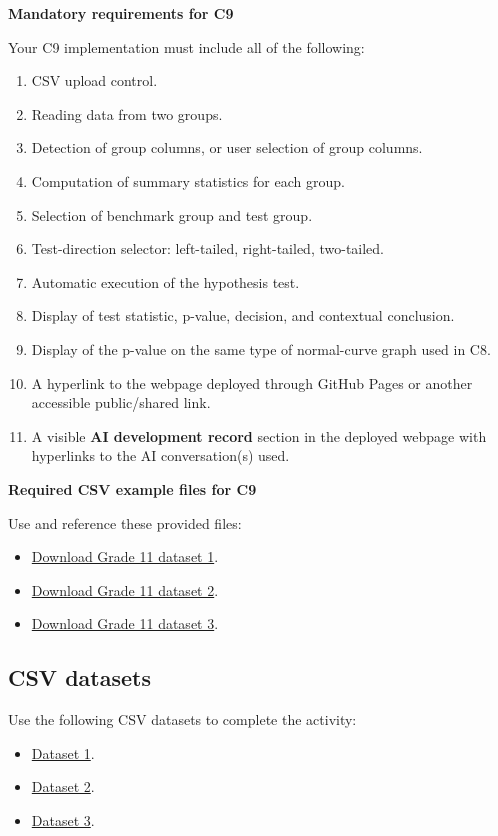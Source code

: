 \documentclass[12pt]{article}
\newcommand{\SubsectionBox}[1]{%
	\noindent\colorbox{gray!30}{%
		\parbox{\linewidth}{\textbf{#1}}%
	}\par\vspace{0.35cm}%
}
\begin{document}
	\SubsectionBox{Mandatory requirements for C9}
	Your C9 implementation must include all of the following:
	\begin{enumerate}
		\item CSV upload control.
		\item Reading data from two groups.
		\item Detection of group columns, or user selection of group columns.
		\item Computation of summary statistics for each group.
		\item Selection of benchmark group and test group.
		\item Test-direction selector: left-tailed, right-tailed, two-tailed.
		\item Automatic execution of the hypothesis test.
		\item Display of test statistic, p-value, decision, and contextual conclusion.
		\item Display of the p-value on the same type of normal-curve graph used in C8.
		\item A hyperlink to the webpage deployed through GitHub Pages or another accessible public/shared link.
		\item A visible \textbf{AI development record} section in the deployed webpage with hyperlinks to the AI conversation(s) used.
	\end{enumerate}
	
	\SubsectionBox{Required CSV example files for C9}
	Use and reference these provided files:
	\begin{itemize}
		\item \href{G11_T3_L4_C8C9C10_dataset_1.csv}{Download Grade 11 dataset 1}.
		\item \href{G11_T3_L4_C8C9C10_dataset_2.csv}{Download Grade 11 dataset 2}.
		\item \href{G11_T3_L4_C8C9C10_dataset_3.csv}{Download Grade 11 dataset 3}.
	\end{itemize}
	
	\subsection*{CSV datasets}

	Use the following CSV datasets to complete the activity:
	\begin{itemize}
		\item \href{https://correosanbartoloedu-my.sharepoint.com/:x:/g/personal/nicolas_lopez_sanbartolo_edu_co/IQCYNF1OE20rQLJqdJg3pzpfAQv1u6tDoW0kHBnX_LXwtYA?e=n76GM0}{Dataset 1}.
		\item \href{https://correosanbartoloedu-my.sharepoint.com/:x:/g/personal/nicolas_lopez_sanbartolo_edu_co/IQDazlshOg4TTorNVkrNv-bpAZEx2g3iqoL47Qz7KynYDV4?e=Nokc5D}{Dataset 2}.
		\item \href{https://correosanbartoloedu-my.sharepoint.com/:x:/g/personal/nicolas_lopez_sanbartolo_edu_co/IQAYBCT4Te-1Q5f6x_dp7phTAdMpBwr0scWLBGOHqnfJxiM?e=LQzlHe}{Dataset 3}.
	\end{itemize}
\end{document}
